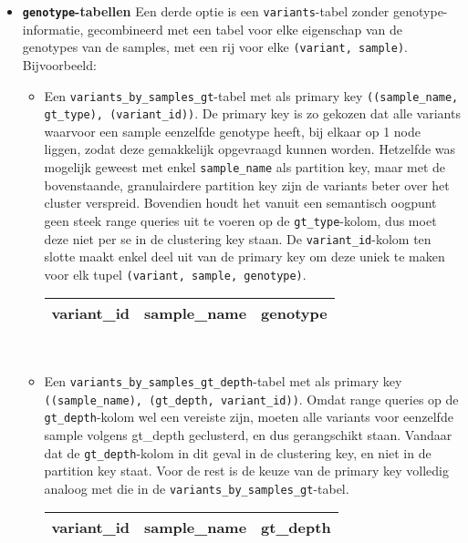 \begin{itemize}
\item \textbf{\texttt{genotype}-tabellen} Een derde optie is een \texttt{variants}-tabel zonder genotype-informatie, gecombineerd met een tabel voor elke eigenschap van de genotypes van de samples, met een rij voor elke \texttt{(variant, sample)}. Bijvoorbeeld:\\

\begin{itemize}

\item Een \texttt{variants\_by\_samples\_gt}-tabel met als primary key \texttt{((sample\_name, gt\_type), (variant\_id))}. De primary key is zo gekozen dat alle variants waarvoor een sample eenzelfde genotype heeft, bij elkaar op 1 node liggen, zodat deze gemakkelijk opgevraagd kunnen worden. Hetzelfde was mogelijk geweest met enkel \texttt{sample\_name} als partition key, maar met de bovenstaande, granulairdere partition key zijn de variants beter over het cluster verspreid. Bovendien houdt het vanuit een semantisch oogpunt geen steek range queries uit te voeren op de \texttt{gt\_type}-kolom, dus moet deze niet per se in de clustering key staan. De \texttt{variant\_id}-kolom ten slotte maakt enkel deel uit van de primary key om deze uniek te maken voor elk tupel \texttt{(variant, sample, genotype)}.\\

\begin{table}[!htbp]
\begin{tabular}{@{}|l|l|l|@{}}
\toprule
variant\_id & sample\_name & genotype \\ \bottomrule
\end{tabular}\\
\end{table}

\item Een \texttt{variants\_by\_samples\_gt\_depth}-tabel met als primary key \texttt{((sample\_name), (gt\_depth, variant\_id))}. Omdat range queries op de \texttt{gt\_depth}-kolom wel een vereiste zijn, moeten alle variants voor eenzelfde sample volgens gt\_depth geclusterd, en dus gerangschikt staan. Vandaar dat de \texttt{gt\_depth}-kolom in dit geval in de clustering key, en niet in de partition key staat. Voor de rest is de keuze van de primary key volledig analoog met die in de \texttt{variants\_by\_samples\_gt}-tabel.

\begin{table}[!htbp]
\begin{tabular}{@{}|l|l|l|@{}}
\toprule
variant\_id & sample\_name & gt\_depth \\ \bottomrule
\end{tabular}
\end{table}


\end{itemize}
\end{itemize}
